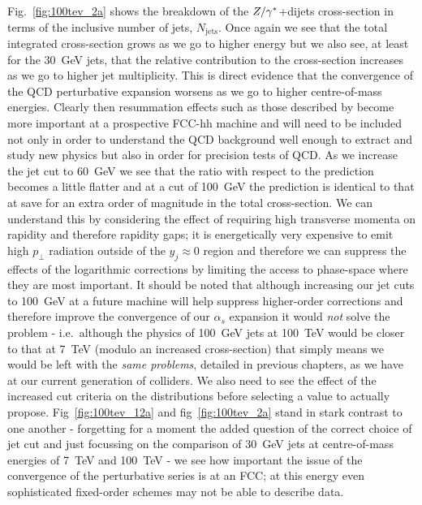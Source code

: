 	Fig.~\eqref{fig:100tev_2a} shows the breakdown of the $Z/\gamma^*$+dijets cross-section in terms of the inclusive number
	of jets, $N_{\text{jets}}$.  Once again we see that the total integrated cross-section grows as we
	go to higher energy but we also see, at least for the 30~GeV jets, that the relative contribution to the cross-section
	increases as we go to higher jet multiplicity.  This is direct evidence that the convergence of the
	QCD perturbative expansion worsens as we go to higher centre-of-mass energies.  Clearly then resummation effects
	such as those described by \hej become more important at a prospective FCC-hh machine and will need
	to be included not only in order to understand the QCD background well enough to extract and
	study new physics but also in order for precision tests of QCD.  As we increase the jet cut to 60~GeV
	we see that the ratio with respect to the \stev prediction becomes a little flatter and at a cut of 100~GeV
	the prediction is identical to that at \stev save for an extra order of magnitude in the total cross-section.
	We can understand this by considering the effect of requiring high transverse momenta on rapidity and therefore
	rapidity gaps; it is energetically very expensive to emit high $p_\perp$ radiation outside of the $y_j\approx0$ region
	and therefore we can suppress the effects of the logarithmic corrections by limiting the access to phase-space
	where they are most important.  It should be noted that although increasing our jet cuts to 100~GeV at a future
	machine will help suppress higher-order corrections and therefore improve the convergence of our $\alpha_s$ expansion
	it would \emph{not} solve the problem - i.e.~although the physics of 100~GeV jets at 100~TeV would be closer to that at 7~TeV
	(modulo an increased cross-section) that simply means we would be left with the \emph{same problems}, detailed in previous
	chapters, as we have at our current generation of colliders.  We also need to see the effect of the increased cut criteria
	on the distributions before selecting a value to actually propose.  Fig~\eqref{fig:100tev_12a} and fig~\eqref{fig:100tev_2a} stand
	in stark contrast to one another - forgetting for a moment the added question of the correct choice of jet cut and just focussing
	on the comparison of 30~GeV jets at centre-of-mass energies of 7~TeV and 100~TeV - we see how important the
	issue of the convergence of the perturbative series is at an FCC; at this energy even sophisticated fixed-order
	schemes may not be able to describe data.

